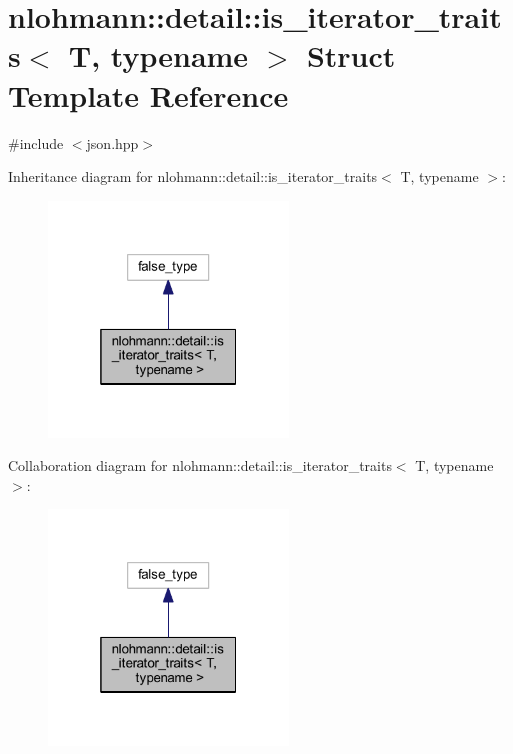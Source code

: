 \hypertarget{structnlohmann_1_1detail_1_1is__iterator__traits}{}\section{nlohmann\+::detail\+::is\+\_\+iterator\+\_\+traits$<$ T, typename $>$ Struct Template Reference}
\label{structnlohmann_1_1detail_1_1is__iterator__traits}


{\ttfamily \#include $<$json.\+hpp$>$}



Inheritance diagram for nlohmann\+::detail\+::is\+\_\+iterator\+\_\+traits$<$ T, typename $>$\+:
\nopagebreak
\begin{figure}[H]
\begin{center}
\leavevmode
\includegraphics[width=181pt]{structnlohmann_1_1detail_1_1is__iterator__traits__inherit__graph}
\end{center}
\end{figure}


Collaboration diagram for nlohmann\+::detail\+::is\+\_\+iterator\+\_\+traits$<$ T, typename $>$\+:
\nopagebreak
\begin{figure}[H]
\begin{center}
\leavevmode
\includegraphics[width=181pt]{structnlohmann_1_1detail_1_1is__iterator__traits__coll__graph}
\end{center}
\end{figure}


